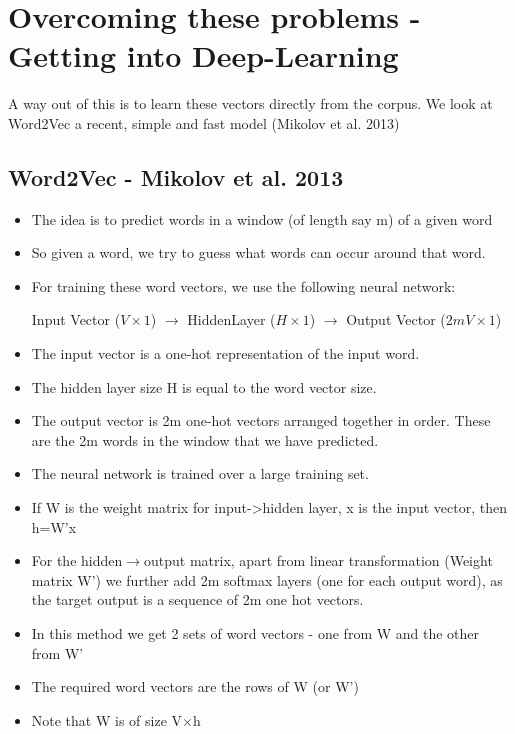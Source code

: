 \documentclass{article}
\begin{document}
\section{Overcoming these problems - Getting into Deep-Learning}
A way out of this is to learn these vectors directly from the corpus. We look at Word2Vec a recent, simple and fast model (Mikolov et al. 2013)

\subsection{Word2Vec - Mikolov et al. 2013}
\begin{itemize}
\item The idea is to predict words in a window (of length say m) of a given word
\item So given a word, we try to guess what words can occur around that word.
\item For training these word vectors, we use the following neural network:
\begin{center}
Input Vector ($V\times1$) $\rightarrow$ HiddenLayer ($H\times1$) $\rightarrow$ Output Vector ($2mV\times1$)
\end{center}
\item The input vector is a one-hot representation of the input word.
\item The hidden layer size H is equal to the word vector size.
\item The output vector is 2m one-hot vectors arranged together in order. These are the 2m words in the window that we have predicted.
\item The neural network is trained over a large training set.
\item If W is the weight matrix for input->hidden layer, x is the input vector, then h=W'x
\item For the hidden$\rightarrow$output matrix, apart from linear transformation (Weight matrix W') we further add 2m softmax layers (one for each output word), as the target output is a sequence of 2m one hot vectors.
\item In this method we get 2 sets of word vectors - one from W and the other from W'
\item The required word vectors are the rows of W (or W')
\item Note that W is of size V$\times$h
\end{itemize}
\end{document}
